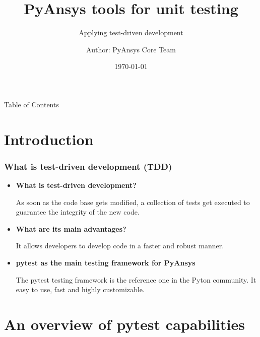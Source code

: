 \documentclass[t]{beamer}
\begin{document}

\title{PyAnsys tools for unit testing}
\subtitle{Applying test-driven development}
\author{Author: PyAnsys Core Team}
\date{\today}

\titleframe{}



\begin{frame}{Table of Contents}
  \tableofcontents
  \vspace{200pt}  %
\end{frame}


\section{Introduction}
\begin{frame}[fragile=singleslide]
  \frametitle{What is test-driven development (TDD)}

  \begin{itemize}

  \item{\textbf{What is test-driven development?}
    
    As soon as the code base gets modified, a collection of tests get executed
    to guarantee the integrity of the new code.

  }

  \item{\textbf{What are its main advantages?}
 
    It allows developers to develop code in a faster and robust manner.

    }

        
  \item {\textbf{pytest as the main testing framework for PyAnsys}

    The pytest testing framework is the reference one in the Pyton community. It
    easy to use, fast and highly customizable.

    }

  \end{itemize}

\end{frame}

\section{An overview of pytest capabilities}
\end{document}
